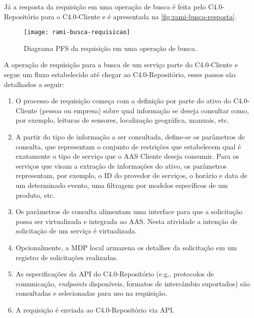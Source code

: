 	Já a resposta da requisição em uma operação de busca é feita pelo C4.0-Repositório para o C4.0-Cliente e é apresentada na \autoref{fig:rami-busca-resposta}.
	
	\begin{figure}[htb]
		\centering
		\caption{Diagrama PFS da requisição em uma operação de busca.}
		\label{fig:rami-busca-requisicao}
		\texttt{[image: rami-busca-requisicao]}
	\end{figure}

	A operação de requisição para a busca de um serviço parte do C4.0-Cliente e segue um fluxo estabelecido até chegar ao C4.0-Repositório, esses passos são detalhados a seguir:
	
	\begin{enumerate}
		
		\item O processo de requisição começa com a definição por parte do ativo do C4.0-Cliente (pessoa ou empresa) sobre qual informação se deseja consultar como, por exemplo, leituras de sensores, localização geográfica, manuais, etc.
		
		\item A partir do tipo de informação a ser consultada, define-se os parâmetros de consulta, que representam o conjunto de restrições que estabelecem qual é exatamente o tipo de serviço que o AAS Cliente deseja consumir. Para os serviços que visam a extração de informações do ativo, os parâmetros representam, por exemplo, o ID do provedor de serviços, o horário e data de um determinado evento, uma filtragem por modelos específicos de um produto, etc.
		
		\item Os parâmetros de consulta alimentam uma interface para que a solicitação possa ser virtualizada e integrada ao AAS. Nesta atividade a intenção de solicitação de um serviço é virtualizada.
		
		\item Opcionalmente, a MDP local armazena os detalhes da solicitação em um registro de solicitações realizadas.
		
		\item As especificações da API do C4.0-Repositório (e.g., protocolos de comunicação, \textit{endpoints} disponíveis, formatos de intercâmbio suportados) são consultadas e selecionadas para uso na requisição.
		
		\item A requisição é enviada ao C4.0-Repositório via API.
		

\end{enumerate}
